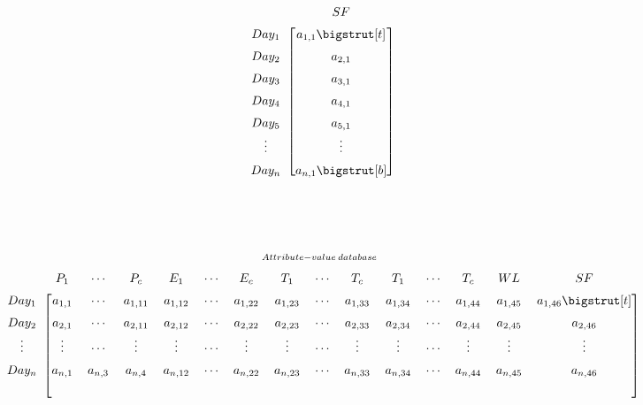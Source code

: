 \documentclass{article}
\begin{document}
\[\begin{array}{ *{8}{c} }
\begin{blockarray}{cccccc}
    & SF \\
    \begin{block}{c[ccccc]}
    Day_1 & a_{1,1}\bigstrut[t] \\
    Day_2 & a_{2,1} \\
    Day_3 & a_{3,1} \\
    Day_4 & a_{4,1} \\
    Day_5 & a_{5,1} \\
    \vdots & \vdots \\
    Day_n & a_{n,1}\bigstrut[b]\\
    \end{block}
    \end{blockarray}\vspace*{-1.25\baselineskip}
  \end{array}
\]
\\\\

\[
  \setlength{\arraycolsep}{0pt}%
  \renewcommand{\arraystretch}{1.5}%
  \begin{array}{ *{8}{c} }
    \scriptstyle Attribute-value \: database %
     \\
    \begin{blockarray}{ccccccccccccccccc}
    & P_1 & \cdots & P_c & E_1 & \cdots & E_c  &
    T_1 & \cdots & T_c & T_1 & \cdots & T_c & WL & SF
    \\
    \begin{block}{c[cccccccccccccccc]}
    Day_1 & a_{1,1}&\cdots&a_{1,11}&
    a_{1,12} & \cdots &a_{1,22} &
    a_{1,23} & \cdots &a_{1,33} &
    a_{1,34} & \cdots &a_{1,44} &
    a_{1,45} & a_{1,46}
    \bigstrut[t] \\
    
    Day_2 & a_{2,1} &\cdots&a_{2,11}& 
    a_{2,12} & \cdots &a_{2,22} &
    a_{2,23} & \cdots &a_{2,33} &
    a_{2,34} & \cdots &a_{2,44} &
    a_{2,45} & a_{2,46}
    \\
    
    \vdots & \vdots & \cdots & \vdots & \vdots &
    \cdots & \vdots & \vdots &
    \cdots & \vdots & \vdots &
    \cdots & \vdots & \vdots & \vdots
    \\
    
    Day_n & a_{n,1}&a_{n,3}&a_{n,4}&
    a_{n,12} & \cdots & a_{n,22} &
    a_{n,23} & \cdots &a_{n,33} &
    a_{n,34} & \cdots &a_{n,44} &
    a_{n,45} & a_{n,46}
    \\
    \\
    \end{block}
    \end{blockarray}\vspace*{-1.25\baselineskip}
  \end{array}
\]
\end{document}
